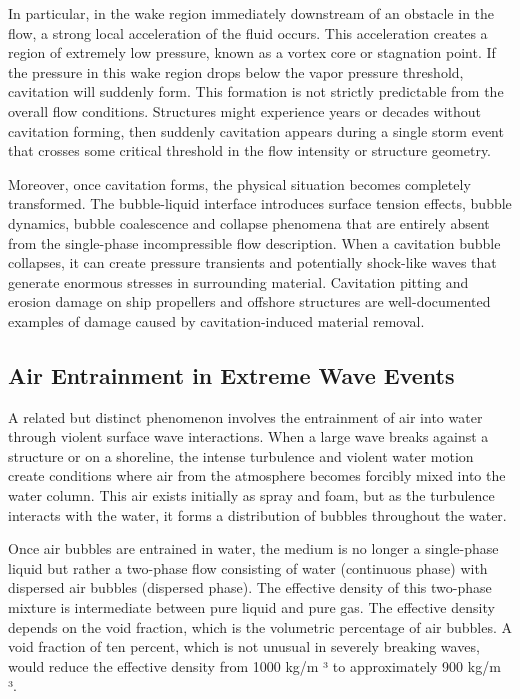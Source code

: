 ﻿\documentclass[a4paper,11pt]{article}
\theoremstyle{definition}
\begin{document}
In particular, in the wake region immediately downstream of an obstacle in the flow, a strong local acceleration of the fluid occurs. This acceleration creates a region of extremely low pressure, known as a vortex core or stagnation point. If the pressure in this wake region drops below the vapor pressure threshold, cavitation will suddenly form. This formation is not strictly predictable from the overall flow conditions. Structures might experience years or decades without cavitation forming, then suddenly cavitation appears during a single storm event that crosses some critical threshold in the flow intensity or structure geometry.

Moreover, once cavitation forms, the physical situation becomes completely transformed. The bubble-liquid interface introduces surface tension effects, bubble dynamics, bubble coalescence and collapse phenomena that are entirely absent from the single-phase incompressible flow description. When a cavitation bubble collapses, it can create pressure transients and potentially shock-like waves that generate enormous stresses in surrounding material. Cavitation pitting and erosion damage on ship propellers and offshore structures are well-documented examples of damage caused by cavitation-induced material removal.

\subsection{Air Entrainment in Extreme Wave Events}

A related but distinct phenomenon involves the entrainment of air into water through violent surface wave interactions. When a large wave breaks against a structure or on a shoreline, the intense turbulence and violent water motion create conditions where air from the atmosphere becomes forcibly mixed into the water column. This air exists initially as spray and foam, but as the turbulence interacts with the water, it forms a distribution of bubbles throughout the water.

Once air bubbles are entrained in water, the medium is no longer a single-phase liquid but rather a two-phase flow consisting of water (continuous phase) with dispersed air bubbles (dispersed phase). The effective density of this two-phase mixture is intermediate between pure liquid and pure gas. The effective density depends on the void fraction, which is the volumetric percentage of air bubbles. A void fraction of ten percent, which is not unusual in severely breaking waves, would reduce the effective density from 1000 kg/m ³ to approximately 900 kg/m ³.
\end{document}
